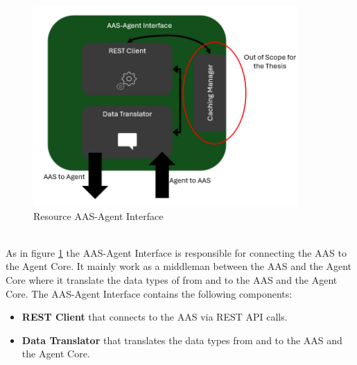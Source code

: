 \newpage
{}
\begin{figure}[h]
    \centering
    \includegraphics[width=0.9\textwidth]{Images/Resource_Agent_AAS_Agent_interface.png}
    \caption{Resource AAS-Agent Interface}
    \label{fig:resource_aas_agent_interface}
\end{figure}
\\
As in figure \ref{fig:resource_aas_agent_interface} the AAS-Agent Interface is responsible for connecting the AAS to the Agent Core.
It mainly work as a middleman between the AAS and the Agent Core where it translate the data types of from and to the AAS and the Agent Core.
The AAS-Agent Interface contains the following components:
\begin{itemize}
    \item \textbf{REST Client} that connects to the AAS via REST API calls.
    \item \textbf{Data Translator} that translates the data types from and to the AAS and the Agent Core.
\end{itemize}

